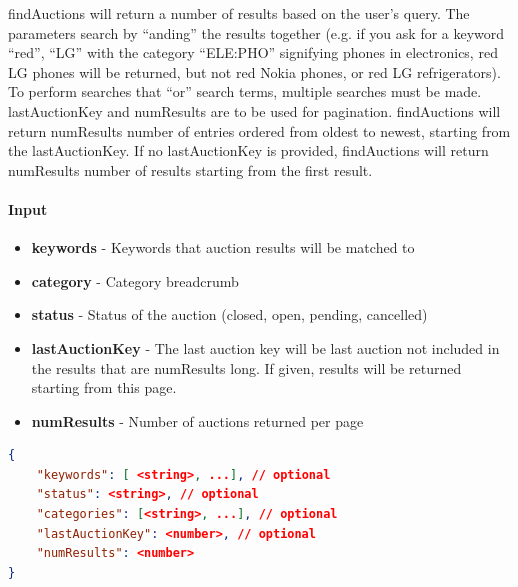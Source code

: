 \documentclass[12pt,a4paper]{article}
\begin{document}
findAuctions will return a number of results based on the user's query. The
parameters search by ``anding'' the results together (e.g. if you ask for a
keyword ``red'', ``LG'' with the category ``ELE:PHO'' signifying phones in
electronics, red LG phones will be returned, but not red Nokia phones, or red
LG refrigerators). To perform searches that ``or'' search terms, multiple
searches must be made. lastAuctionKey and numResults are to be used for
pagination. findAuctions will return numResults number of entries ordered from
oldest to newest, starting from the lastAuctionKey. If no lastAuctionKey is
provided, findAuctions will return numResults number of results starting from
the first result.

\paragraph{Input} 

\begin{itemize}
    \item \textbf{keywords} - Keywords that auction results will be matched to
    \item \textbf{category} - Category breadcrumb
    \item \textbf{status} - Status of the auction (closed, open, pending, cancelled)
    \item \textbf{lastAuctionKey} - The last auction key will be last auction
        not included in the results that are numResults long. If given, results
        will be returned starting from this page.
    \item \textbf{numResults} - Number of auctions returned per page
\end{itemize}

\begin{lstlisting}[language=json,numbers=none]
{
    "keywords": [ <string>, ...], // optional
    "status": <string>, // optional
    "categories": [<string>, ...], // optional
    "lastAuctionKey": <number>, // optional
    "numResults": <number>
}
\end{lstlisting}
\end{document}
